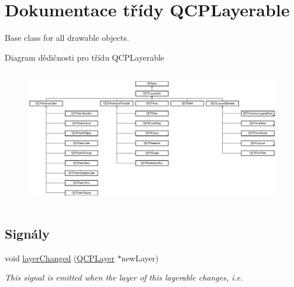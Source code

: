\hypertarget{classQCPLayerable}{}\section{Dokumentace třídy Q\+C\+P\+Layerable}
\label{classQCPLayerable}


Base class for all drawable objects.  


Diagram dědičnosti pro třídu Q\+C\+P\+Layerable\begin{figure}[H]
\begin{center}
\leavevmode
\includegraphics[height=6.075949cm]{classQCPLayerable}
\end{center}
\end{figure}
\subsection*{Signály}
\begin{DoxyCompactItemize}
\item 
void \hyperlink{classQCPLayerable_abbf8657cedea73ac1c3499b521c90eba}{layer\+Changed} (\hyperlink{classQCPLayer}{Q\+C\+P\+Layer} $\ast$new\+Layer)
\begin{DoxyCompactList}\small\item\em This signal is emitted when the layer of this layerable changes, i.\+e. \end{DoxyCompactList}\end{DoxyCompactItemize}
